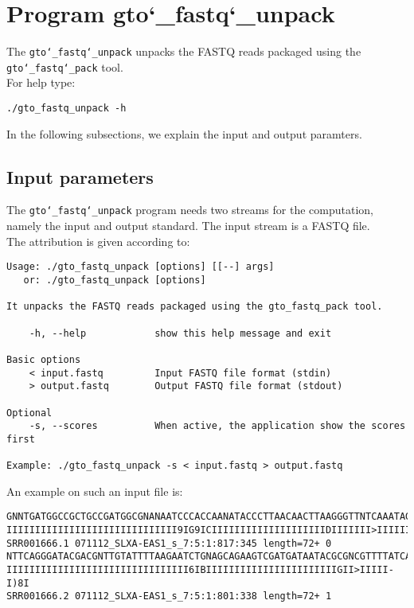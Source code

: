 \section{Program gto\char`_fastq\char`_unpack}
The \texttt{gto\char`_fastq\char`_unpack} unpacks the FASTQ reads packaged using the \texttt{gto\char`_fastq\char`_pack} tool.\\
For help type:
\begin{lstlisting}
./gto_fastq_unpack -h
\end{lstlisting}
In the following subsections, we explain the input and output paramters.

\subsection*{Input parameters}

The \texttt{gto\char`_fastq\char`_unpack} program needs two streams for the computation, namely the input and output standard. The input stream is a FASTQ file.\\
The attribution is given according to:
\begin{lstlisting}
Usage: ./gto_fastq_unpack [options] [[--] args]
   or: ./gto_fastq_unpack [options]

It unpacks the FASTQ reads packaged using the gto_fastq_pack tool.

    -h, --help            show this help message and exit

Basic options
    < input.fastq         Input FASTQ file format (stdin)
    > output.fastq        Output FASTQ file format (stdout)

Optional
    -s, --scores          When active, the application show the scores first
    
Example: ./gto_fastq_unpack -s < input.fastq > output.fastq
\end{lstlisting}
An example on such an input file is:
\begin{lstlisting}
GNNTGATGGCCGCTGCCGATGGCGNANAATCCCACCAANATACCCTTAACAACTTAAGGGTTNTCAAATAGA
IIIIIIIIIIIIIIIIIIIIIIIIIIIIII9IG9ICIIIIIIIIIIIIIIIIIIIIDIIIIIII>IIIIII/
SRR001666.1 071112_SLXA-EAS1_s_7:5:1:817:345 length=72+	0
NTTCAGGGATACGACGNTTGTATTTTAAGAATCTGNAGCAGAAGTCGATGATAATACGCGNCGTTTTATCAN
IIIIIIIIIIIIIIIIIIIIIIIIIIIIIIII6IBIIIIIIIIIIIIIIIIIIIIIIIGII>IIIII-I)8I
SRR001666.2 071112_SLXA-EAS1_s_7:5:1:801:338 length=72+ 1
\end{lstlisting}

